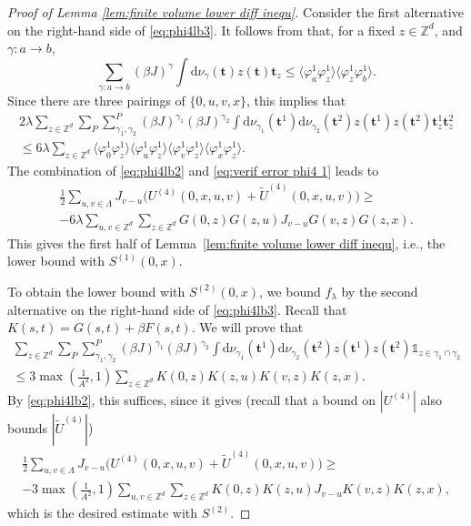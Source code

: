 \documentclass[11pt,a4paper]{article}
\numberwithin{equation}{section}
\theoremstyle{plain}
\theoremstyle{definition}
\newcommand\1{\mathds{1}}
\begin{document}
\begin{proof}[Proof of Lemma \textup{\ref{lem:finite volume lower diff inequ}}]
Consider the first alternative on the right-hand side of \eqref{eq:phi4lb3}.
It follows from \cite[(3.13)]{BFS83II} that, for a fixed $z\in \mathbb Z^d$, and $\gamma:a\rightarrow b$,
\begin{equation}
	\sum_{\gamma:a\rightarrow b}(\beta J)^{\gamma}\int \mathrm{d}\nu_{\gamma}(\mathbf{t})z(\mathbf{t})\mathbf{t}_z\leq \langle \varphi_a^1\varphi_z^1\rangle\langle\varphi_z^1\varphi_b^1\rangle.
	\end{equation}
Since there are three pairings of $\{0,u,v,x\}$, this implies that
\begin{multline}
	2\lambda\sum_{z\in \mathbb Z^d}\sum_P\sum_{\gamma_1,\gamma_2}^P(\beta J)^{\gamma_1}(\beta J)^{\gamma_2}\int \mathrm{d}\nu_{\gamma_1}(\mathbf{t}^1)\mathrm{d}\nu_{\gamma_2}(\mathbf{t}^2)z(\mathbf{t}^1)z(\mathbf{t}^2) \mathbf{t}^1_z\mathbf{t}^2_z
	\\\leq 6\lambda \sum_{z\in \mathbb Z^d}\langle \varphi_0^1\varphi_z^1\rangle\langle \varphi_u^1\varphi_z^1\rangle \langle \varphi_v^1\varphi_z^1\rangle \langle \varphi_x^1\varphi_z^1\rangle
.
\label{eq:verif error phi4 1}
\end{multline}
The combination of \eqref{eq:phi4lb2} and \eqref{eq:verif error phi4 1}
leads to
\begin{multline}
\frac 12 \sum_{u,v\in\Lambda}
J_{v-u} \Big( U^{(4)}(0,x,u,v)+\tilde{U}^{(4)}(0,x,u,v)\Big)
\ge
\\
- 6
\lambda \sum_{u,v\in \mathbb Z^d}
\sum_{z\in \mathbb Z^d} G(0,z)G(z,u)J_{v-u}G(v,z)G(z,x).
\end{multline}
This gives the first half of Lemma~\ref{lem:finite volume lower diff inequ}, i.e., the lower bound with $S^{(1)}(0,x)$.



To obtain the lower bound with $S^{(2)}(0,x)$, we bound $f_\lambda$ by the second alternative on the right-hand side of \eqref{eq:phi4lb3}.
Recall that $K(s,t) = G(s,t)+\beta F(s,t)$.  We will prove that
\begin{multline}\label{eq: lemma verif error phi4 3}
	\sum_{z\in \mathbb Z^d}\sum_P\sum_{\gamma_1,\gamma_2}^P(\beta J)^{\gamma_1}(\beta J)^{\gamma_2}\int \mathrm{d}\nu_{\gamma_1}(\mathbf{t}^1)\mathrm{d}\nu_{\gamma_2}(\mathbf{t}^2)z(\mathbf{t}^1)z(\mathbf{t}^2) \mathds{1}_{z\in \gamma_1\cap \gamma_2}
	\\\leq 3 \max \left(\frac{1}{A^2},1\right)  \sum_{z\in \mathbb Z^d} K(0,z)K(z,u)K(v,z)K(z,x).
	\end{multline}
By \eqref{eq:phi4lb2},
this suffices, since it gives
(recall that a bound on $|U^{(4)}|$ also bounds $|\tilde{U}^{(4)}|$)
\begin{multline}
\frac 12 \sum_{u,v\in\Lambda}
J_{v-u} \Big( U^{(4)}(0,x,u,v)+\tilde{U}^{(4)}(0,x,u,v)\Big)
\ge
\\-
3
\max \left(\frac{1}{A^2},1\right)
\sum_{u,v\in \mathbb Z^d}
\sum_{z\in \mathbb Z^d} K(0,z)K(z,u)J_{v-u}K(v,z)K(z,x),
\end{multline}
which is the desired estimate with $S^{(2)}$.



\end{proof}
\end{document}
